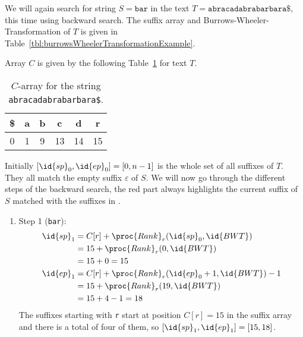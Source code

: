\begin{Example}
  We will again search for string $S=\texttt{bar}$ in the text $T=\texttt{abracadabrabarbara\$}$, this time using backward search. The suffix array and Burrows-Wheeler-Transformation of $T$ is given in Table~\ref{tbl:burrowsWheelerTransformationExample}.

  Array $C$ is given by the following Table~\ref{tbl:backwardSearchCExample} for text $T$.
  \begin{table}[htb]
    \centering
    \begin{tabular}{cccccc}
      \toprule
      \$ & a & b & c & d & r \\
      \midrule
      0 & 1 & 9 & 13 & 14 & 15 \\
      \bottomrule
    \end{tabular}
    \caption{$C$-array for the string \texttt{abracadabrabarbara\$}.}
    \label{tbl:backwardSearchCExample}
  \end{table}

  Initially $[\id{sp}_0,\id{ep}_0]=[0,n-1]$ is the whole set of all suffixes of $T$. They all match the empty suffix $\varepsilon$ of $S$. We will now go through the different steps of the backward search, the red part always highlights the current suffix of $S$ matched with the suffixes in .
  \begin{enumerate}
    \item Step 1 (\texttt{ba{\color{red}r}}):
    \begin{align*}
      \id{sp}_1 &= C[r] + \proc{Rank}_r(\id{sp}_0, \id{BWT}) \\
                &= 15 + \proc{Rank}_r(0, \id{BWT}) \\
                &= 15 + 0 = 15 \\
      \id{ep}_1 &= C[r] + \proc{Rank}_r(\id{ep}_0 + 1, \id{BWT}) - 1 \\
                &= 15 + \proc{Rank}_r(19, \id{BWT}) \\
                &= 15 + 4 - 1 = 18
    \end{align*}
    The suffixes starting with \texttt{r} start at position $C[r]=15$ in the suffix array and there is a total of four of them, so $[\id{sp}_1,\id{ep}_1]=[15,18]$.


\end{enumerate}
\end{Example}
